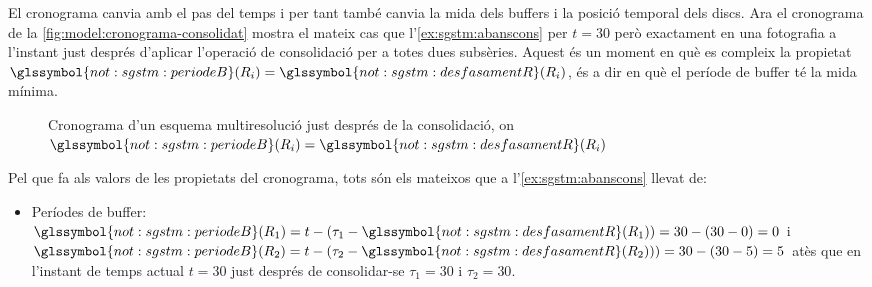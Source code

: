 \begin{example}
   \label{ex:sgstm:desprescons}


   El cronograma canvia amb el pas del temps i per tant també canvia
   la mida dels buffers i la posició temporal dels discs.  Ara el
   cronograma de la \autoref{fig:model:cronograma-consolidat} mostra
   el mateix cas que l'\autoref{ex:sgstm:abanscons} per $t=30$ però
   exactament en una fotografia a l'instant just després d'aplicar
   l'operació de consolidació per a totes dues subsèries. Aquest és un
   moment en què es compleix la propietat
   $\glssymbol{not:sgstm:periodeB}(R_i)=
   \glssymbol{not:sgstm:desfasamentR}(R_i)$, és a dir en què el
   període de buffer té la mida mínima.

\begin{figure}[tp]
  \centering
  
  \caption{Cronograma d'un esquema multiresolució just després de la consolidació, on $\glssymbol{not:sgstm:periodeB}(R_i)=\glssymbol{not:sgstm:desfasamentR}(R_i)$}
  \label{fig:model:cronograma-consolidat}
\end{figure}



Pel que fa als valors de les propietats del cronograma, tots són els
mateixos que a l'\autoref{ex:sgstm:abanscons} llevat de:
 \begin{itemize}
  \item Períodes de buffer: $\glssymbol{not:sgstm:periodeB}(R_1)
    =t-(\tau_1-\glssymbol{not:sgstm:desfasamentR}(R_1))
    =30-(30-0)=0$ i $\glssymbol{not:sgstm:periodeB}(R_2)
    =t-(\tau_2-\glssymbol{not:sgstm:desfasamentR}(R_2)))
    =30-(30-5)=5$ atès que en l'instant de temps actual $t=30$ just
    després de consolidar-se $\tau_1=30$ i $\tau_2=30$.
  \end{itemize}
 

\end{example}




